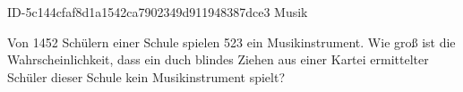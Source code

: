 \begin{exercise}
      {ID-5c144cfaf8d1a1542ca7902349d911948387dce3}
      {Musik}
  \ifproblem\problem\par
    Von \num{1452} Schülern einer Schule spielen \num{523} ein Musikinstrument.
    Wie groß ist die Wahrscheinlichkeit, dass ein duch blindes Ziehen aus
    einer Kartei ermittelter Schüler dieser Schule kein Musikinstrument
    spielt?
  \fi
\end{exercise}
